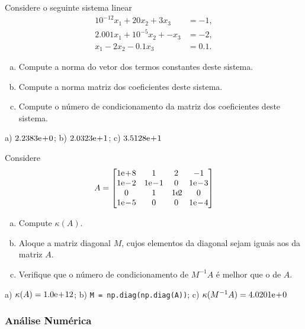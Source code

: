 \begin{exer}
  Considere o seguinte sistema linear
  \begin{align}
    10^{-12}x_1 + 20x_2 + 3x_3 &= -1,\\
    2.001x_1 + 10^{-5}x_2 + - x_3 &= -2,\\
    x_1 - 2x_2 - 0.1x_3 &= 0.1.
  \end{align}
  \begin{enumerate}[a)]
  \item Compute a norma do vetor dos termos constantes deste sistema.
  \item Compute a norma matriz dos coeficientes deste sistema.
  \item Compute o número de condicionamento da matriz dos coeficientes deste sistema.
  \end{enumerate}
\end{exer}
\begin{resp}
  a) $2.2383\mathrm{e}\!+\!0$; b) $2.0323\mathrm{e}\!+\!1$; c) $3.5128\mathrm{e}\!+\!1$
\end{resp}

\begin{exer}
  Considere
  \begin{equation}
    A =
    \begin{bmatrix}
      1\E+8 & 1 & 2 & -1\\
      1\E-2 & 1\E-1 & 0 & 1\E-3\\
      0 & 1 & 1\E2 & 0\\
      1\E-5 & 0 & 0 & 1\E-4
    \end{bmatrix}
  \end{equation}
  \begin{enumerate}[a)]
  \item Compute $\kappa(A)$.
  \item Aloque a matriz diagonal $M$, cujos elementos da diagonal sejam iguais aos da matriz $A$.
  \item Verifique que o número de condicionamento de $M^{-1}A$ é melhor que o de $A$.
  \end{enumerate}
\end{exer}
\begin{resp}
  a) $\kappa(A) = 1.0\mathrm{e}\!+\!12$; b) \lstinline+M = np.diag(np.diag(A))+; c) $\kappa(M^{-1}A) = 4.0201\mathrm{e}\!+\!0$
\end{resp}

\subsubsection{Análise Numérica}

